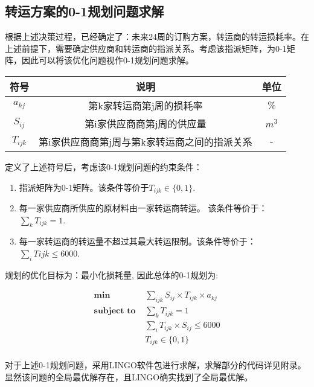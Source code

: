 \documentclass{my_paper}
\begin{document}
\subsection{转运方案的0-1规划问题求解}

根据上述决策过程，已经确定了：未来24周的订购方案，转运商的转运损耗率。在上述前提下，需要确定供应商和转运商的指派关系。考虑该指派矩阵，为0-1矩阵，因此可以将该优化问题视作0-1规划问题求解。

\begin{table}[h]
		\centering
		\begin{tabular}{ccc}
			\hline
			符号 &  说明  & 单位 \\
			\hline
      $a_{kj}$ & 第k家转运商第j周的损耗率  & \% \\
      $S_{ij}$ & 第i家供应商商第j周的供应量 & $m^3$ \\
      $T_{ijk}$ & 第i家供应商商第j周与第k家转运商之间的指派关系 & - \\
		\end{tabular}
	\end{table}

定义了上述符号后，考虑该0-1规划问题的约束条件：

\begin{enumerate}

\item 指派矩阵为0-1矩阵。该条件等价于$T_{ijk} \in \{0,1\} $.

\item 每一家供应商所供应的原材料由一家转运商转运。 该条件等价于：$ \sum_{k} T_{ijk} = 1$.

\item 每一家转运商的转运量不超过其最大转运限制。该条件等价于：$\sum_{i} T{ijk} \le 6000 $.

\end{enumerate}

规划的优化目标为：最小化损耗量, 因此总体的0-1规划为:

\begin{align*} 
\textbf{min } & \sum_{ijk} S_{ij} \times  T_{ijk} \times a_{kj} \\
\textbf{subject to } &  \sum_{k} T_{ijk} = 1 \\
& \sum_{i} T_{ijk} \times S_{ij} \le 6000 \\
& T_{ijk} \in \{0,1\} \\
\end{align*}

对于上述0-1规划问题，采用LINGO软件包进行求解，求解部分的代码详见附录。
显然该问题的全局最优解存在，且LINGO确实找到了全局最优解。
\end{document}
